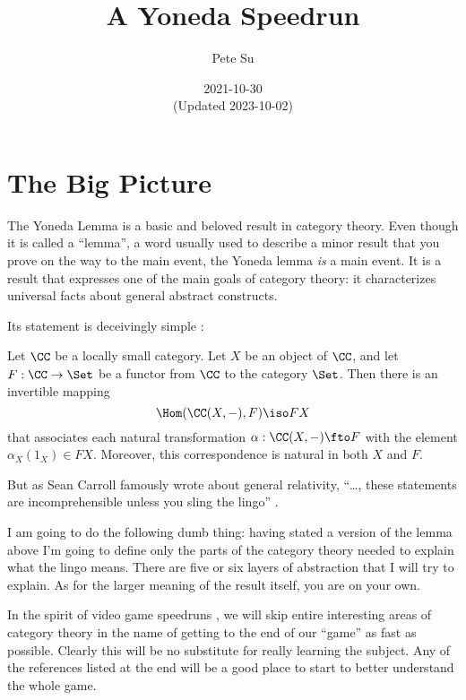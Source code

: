 
\usepackage{microtype}
\usepackage{datetime2}



\title{\Large A Yoneda Speedrun}
\author{\large Pete Su}
\date{\normalsize 2021-10-30 \\ {\footnotesize (Updated 2023-10-02)}}

\maketitle

\section{The Big Picture}

The Yoneda Lemma is a basic and beloved result in category theory. Even though it is
called a ``lemma'', a word usually used to describe a minor result that you prove on the
way to the main event, the Yoneda lemma {\it is} a main event. It is a result that
expresses one of the main goals of category theory: it characterizes universal facts about
general abstract constructs.

Its statement is deceivingly simple \cite{Riehl2016}:

\pg
Let $\CC$ be a locally small category. Let $X$ be an object of $\CC$, and let $F: \CC \to
\Set$ be a functor from $\CC$ to the category $\Set$. Then there is an invertible mapping
$$
\Hom(\CC(X, -),F) \iso FX
$$
that associates each natural transformation $\alpha:\CC(X,-) \fto F$ with the element
$\alpha_X(1_X) \in FX$. Moreover, this correspondence is natural in both $X$ and $F$.

\pg
But as Sean Carroll famously wrote about general relativity, ``\dots, these statements are
incomprehensible unless you sling the lingo'' \cite{carroll}.

I am going to do the following dumb thing: having stated a version of the lemma above I'm
going to define only the parts of the category theory needed to explain what the lingo
means. There are five or six layers of abstraction that I will 
try to explain. As for the larger meaning of the result itself, you are on your own. 

In the spirit of video game speedruns \cite{lobos}, we will skip entire interesting areas
of category theory in the name of getting to the end of our ``game'' as fast
as possible. Clearly this will be no substitute for really learning the subject. Any of
the references listed at the end will be a good place to start to better understand the
whole game.

